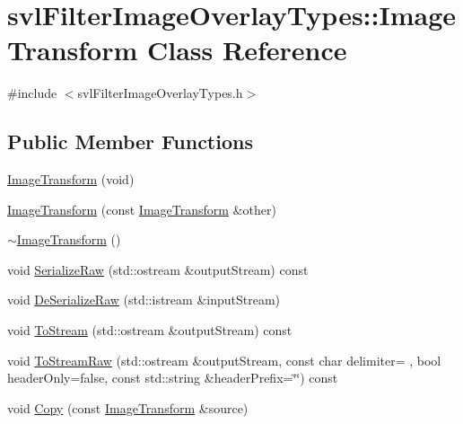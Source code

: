 \hypertarget{classsvl_filter_image_overlay_types_1_1_image_transform}{}\section{svl\+Filter\+Image\+Overlay\+Types\+:\+:Image\+Transform Class Reference}
\label{classsvl_filter_image_overlay_types_1_1_image_transform}


{\ttfamily \#include $<$svl\+Filter\+Image\+Overlay\+Types.\+h$>$}

\subsection*{Public Member Functions}
\begin{DoxyCompactItemize}
\item 
\hyperlink{classsvl_filter_image_overlay_types_1_1_image_transform_a0aeb462b8748ba0a98dae381a91ee0e1}{Image\+Transform} (void)
\item 
\hyperlink{classsvl_filter_image_overlay_types_1_1_image_transform_a4486f53440c4c5bc2d2681ec78f59fab}{Image\+Transform} (const \hyperlink{classsvl_filter_image_overlay_types_1_1_image_transform}{Image\+Transform} \&other)
\item 
\hyperlink{classsvl_filter_image_overlay_types_1_1_image_transform_a42d898db223c9d5b55711a1bd6194c53}{$\sim$\+Image\+Transform} ()
\item 
void \hyperlink{classsvl_filter_image_overlay_types_1_1_image_transform_a050bcaa8afdef71af3de3847488a2dd7}{Serialize\+Raw} (std\+::ostream \&output\+Stream) const 
\item 
void \hyperlink{classsvl_filter_image_overlay_types_1_1_image_transform_ae42e1520566006fcaff76f2941df8913}{De\+Serialize\+Raw} (std\+::istream \&input\+Stream)
\item 
void \hyperlink{classsvl_filter_image_overlay_types_1_1_image_transform_ade308ea2fb6f2b0f05633e75cc63725a}{To\+Stream} (std\+::ostream \&output\+Stream) const 
\item 
void \hyperlink{classsvl_filter_image_overlay_types_1_1_image_transform_a46ee7ff17901ee27423dc76159ebb3af}{To\+Stream\+Raw} (std\+::ostream \&output\+Stream, const char delimiter= \textquotesingle{} \textquotesingle{}, bool header\+Only=false, const std\+::string \&header\+Prefix=\char`\"{}\char`\"{}) const 
\item 
void \hyperlink{classsvl_filter_image_overlay_types_1_1_image_transform_a5a7573f40bf71b68ef300d74e27a0433}{Copy} (const \hyperlink{classsvl_filter_image_overlay_types_1_1_image_transform}{Image\+Transform} \&source)

\end{DoxyCompactItemize}
